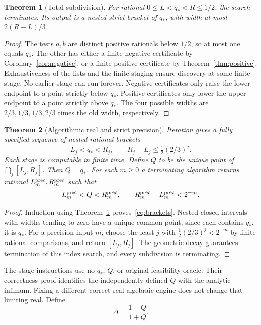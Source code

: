 \documentclass[11pt,a4paper]{article}
\newtheorem{theorem}{Theorem}[section]
\theoremstyle{definition}\newtheorem{definition}[theorem]{Definition}
\theoremstyle{remark}\newtheorem{remark}[theorem]{Remark}
\begin{document}
\begin{theorem}[Total subdivision]\label{thm:step}
For rational $0\leq L<q_*<R\leq1/2$, the search terminates. Its output
is a nested strict bracket of $q_*$, with width at most $2(R-L)/3$.
\end{theorem}
\begin{proof}
The tests $a,b$ are distinct positive rationals below $1/2$, so at most
one equals $q_*$. The other has either a finite negative certificate
by Corollary~\ref{cor:negative}, or a finite positive certificate by
Theorem~\ref{thm:positive}. Exhaustiveness of the lists and the finite
staging ensure discovery at some finite stage. No earlier stage can
run forever. Negative certificates only raise the lower endpoint to a
point strictly below $q_*$. Positive certificates only lower the upper
endpoint to a point strictly above $q_*$. The four possible widths are
$2/3,1/3,1/3,2/3$ times the old width, respectively.
\end{proof}

\begin{theorem}[Algorithmic real and strict precision]\label{thm:Q}
Iteration gives a fully specified sequence of nested rational brackets
\begin{equation}\label{eq:brackets}
 L_j<q_*<R_j,\qquad R_j-L_j\leq\tfrac12(2/3)^j.
\end{equation}
Each stage is computable in finite time. Define $Q$ to be the unique
point of $\bigcap_j[L_j,R_j]$. Then $Q=q_*$. For each $m\geq0$ a
terminating algorithm returns rational $L_m^{\rm prec},R_m^{\rm prec}$
such that
\begin{equation}\label{eq:precision}
 L_m^{\rm prec}<Q<R_m^{\rm prec},\qquad
 R_m^{\rm prec}-L_m^{\rm prec}<2^{-m}.
\end{equation}
\end{theorem}
\begin{proof}
Induction using Theorem~\ref{thm:step} proves~\eqref{eq:brackets}.
Nested closed intervals with widths tending to zero have a unique common
point; since each contains $q_*$, it is $q_*$. For a precision input $m$,
choose the least $j$ with $\tfrac12(2/3)^j<2^{-m}$ by finite rational
comparisons, and return $[L_j,R_j]$. The geometric decay guarantees
termination of this index search, and every subdivision is terminating.
\end{proof}
The stage instructions use no $q_*$, $Q$, or original-feasibility oracle.
Their correctness proof identifies the independently defined $Q$ with
the analytic infimum. Fixing a different correct real-algebraic engine
does not change that limiting real. Define
\begin{equation}\label{eq:Delta}
 \Delta=\frac{1-Q}{1+Q}.
\end{equation}
\end{document}
